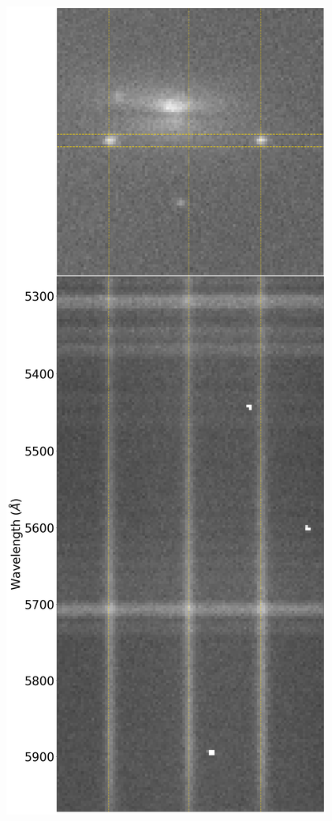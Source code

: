 \documentclass[a4paper,oneside,12pt, class=Latex/Classes/PhDthesisPSnPDF, crop=false]{standalone}
\begin{document}
\begin{figure}
    \centering
    \includegraphics[height=0.81\textheight]{../Images/chapter_2/phot_and_spec_example.png}

\end{figure}
\end{document}
